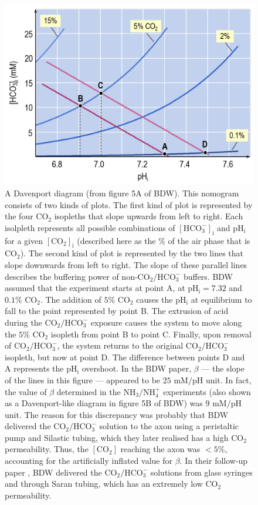 \documentclass[fleqn,10pt]{physiome}
\begin{document}
\begin{figure}[ht]
\centering
\includegraphics[width=0.5\linewidth]{img/Figure 7.png}
\caption{\label{fig:7} A Davenport diagram (from figure 5A of BDW). This nomogram consists of two kinds of plots. The first kind of plot is represented by the four $\mathrm{CO_2}$ isopleths that slope upwards from left to right. Each isolpleth represents all possible combinations of $\mathrm{[HCO_3^-]_i}$ and $\mathrm{pH_i}$ for a given $\mathrm{[CO_2]_i}$ (described here as the $\%$ of the air phase that is $\mathrm{CO_2}$). The second kind of plot is represented by the two lines that slope downwards from left to right. The slope of these parallel lines describes the buffering power of non-$\mathrm{CO_2}/\mathrm{HCO_3^-}$ buffers. BDW assumed that the experiment starts at point A, at $\mathrm{pH_i} = 7.32$ and $0.1\%$ $\mathrm{CO_2}$. The addition of $5\%$ $\mathrm{CO_2}$ causes the $\mathrm{pH_i}$ at equilibrium to fall to the point represented by point B. The extrusion of acid during the $\mathrm{CO_2}/\mathrm{HCO_3^-}$ exposure causes the system to move along the $5\%$ $\mathrm{CO_2}$ isopleth from point B to point C. Finally, upon removal of $\mathrm{CO_2}/\mathrm{HCO_3^-}$, the system returns to the original $\mathrm{CO_2}/\mathrm{HCO_3^-}$ isopleth, but now at point D. The difference between points D and A represents the $\mathrm{pH_i}$ overshoot. In the BDW paper, $\beta$ --- the slope of the lines in this figure --- appeared to be $25$ $\mathrm{mM}/\mathrm{pH}$ unit. In fact, the value of $\beta$ determined in the $\mathrm{NH_3}/\mathrm{NH_4^+}$ experiments (also shown as a Davenport-like diagram in figure 5B of BDW) was $9$ $\mathrm{mM}/\mathrm{pH}$ unit. The reason for this discrepancy was probably that BDW delivered the $\mathrm{CO_2}/\mathrm{HCO_3^-}$ solution to the axon using a peristaltic pump and Silastic tubing, which they later realised has a high $\mathrm{CO_2}$ permeability. Thus, the $\mathrm{[CO_2]}$ reaching the axon was $<5\%$, accounting for the artificially inflated value for $\beta$. In their follow-up paper \citep{boron1976intracellular}, BDW delivered the $\mathrm{CO_2}/\mathrm{HCO_3^-}$ solutions from glass syringes and through Saran tubing, which has an extremely low $\mathrm{CO_2}$ permeability.}
\end{figure}
\end{document}
